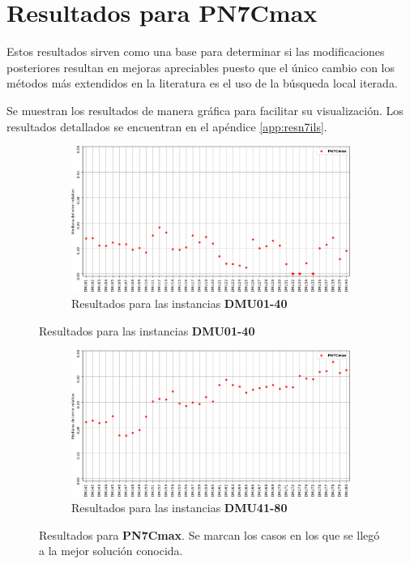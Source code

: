 \section{Resultados para PN7Cmax}
Estos resultados sirven como una base para determinar si las modificaciones posteriores resultan en mejoras apreciables puesto que el único cambio con los métodos más extendidos en la literatura es el uso de la búsqueda local iterada.

Se muestran los resultados de manera gráfica para facilitar su visualización. Los resultados detallados se encuentran en el apéndice \ref{app:resn7ils}. 

\begin{figure}[hbtp]
    \begin{subfigure}{\textwidth}
        \centering
        \includegraphics[scale=.65]{Imagenes/resn7ils1.png}
        \caption{Resultados para las instancias \textbf{DMU01-40}}
    \end{subfigure}
\end{figure}
\begin{figure}[H]\ContinuedFloat
    \begin{subfigure}{\textwidth}
        \centering
        \includegraphics[scale=.65]{Imagenes/resn7ils2.png}
        \caption{Resultados para las instancias \textbf{DMU41-80}}
    \end{subfigure}
    \caption{Resultados para \textbf{PN7Cmax}. Se marcan los casos en los que se llegó a la mejor solución conocida.}
    \label{fig:PN7Cmax}
\end{figure}

